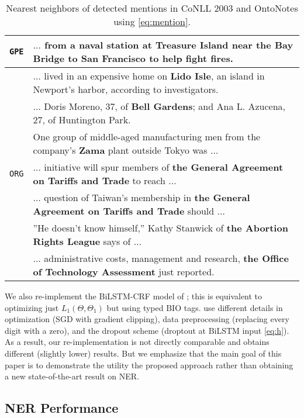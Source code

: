 \documentclass[11pt,letterpaper,UTF8]{article}
\begin{document}
\begin{table*}[t!]
\begin{center}
{\begin{tabular}{|l|l|}
\texttt{GPE} & $\ldots$ from a naval station at \textbf{Treasure Island} near the Bay Bridge to San Francisco to help fight fires. \\
\hline
&$\ldots$ lived in an expensive home on \textbf{Lido Isle}, an island in Newport's harbor, according to investigators. \\
&$\ldots$ Doris Moreno, 37, of \textbf{Bell Gardens}; and Ana L. Azucena, 27, of Huntington Park. \\
&One group of middle-aged manufacturing men from the company's \textbf{Zama} plant outside Tokyo was $\ldots$ \\
\hline
\texttt{ORG} & $\ldots$ initiative will spur members of \textbf{the General Agreement on Tariffs and Trade} to reach $\ldots$ \\
\hline
& $\ldots$ question of Taiwan's membership in \textbf{the General Agreement on Tariffs and Trade} should $\ldots$ \\
&''He doesn't know himself,'' Kathy Stanwick of \textbf{the Abortion Rights League} says of $\ldots$ \\
&$\ldots$ administrative costs, management and research, \textbf{the Office of Technology Assessment} just reported.\\
\hline

\end{tabular}
\caption{Nearest neighbors of detected mentions in CoNLL 2003 and OntoNotes using \eqref{eq:mention}.}
\label{tab:neighbors}
}
\end{center}
\vspace{-3mm}
\end{table*}


We also re-implement the BiLSTM-CRF model of ;
this is equivalent to optimizing just $L_1(\Theta, \Theta_1)$ but using typed BIO tags.
 use different details
in optimization (SGD with gradient clipping), data preprocessing (replacing every digit with a zero),
and the dropout scheme (droptout at BiLSTM input \eqref{eq:h}).
As a result, our re-implementation is not directly comparable and obtains different (slightly lower) results.
But we emphasize that the main goal of this paper is to demonstrate the utility the proposed approach
rather than obtaining a new state-of-the-art result on NER.

\subsection{NER Performance}
\end{document}
